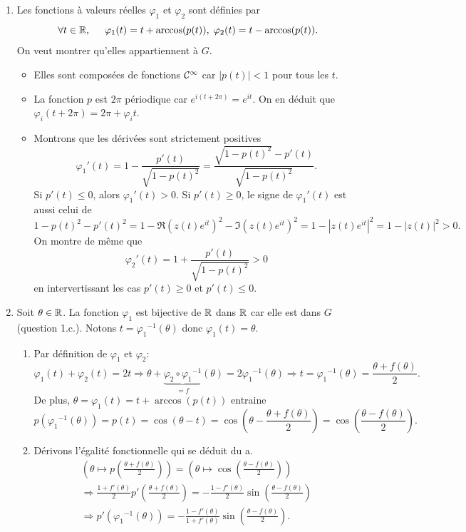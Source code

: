 \begin{enumerate}
\item Les fonctions à valeurs réelles $\varphi_1$ et $\varphi_2$ sont définies par
\[
  \forall t \in \mathbb{R},\hspace{0.5cm} \varphi_{1}(t) = t + \arccos(p(t)), \; \varphi_{2}(t) = t - \arccos(p(t)).
\]
On veut montrer qu'elles appartiennent à $G$.
\begin{itemize}
  \item Elles sont composées de fonctions $\mathcal{C} ^{\infty}$ car $|p(t)| < 1$ pour tous les $t$.
  \item La fonction $p$ est $2\pi$ périodique car $e^{i(t+2\pi)} = e^{it}$. On en déduit que $\varphi_i(t+2\pi) = 2\pi + \varphi_it$.
  \item Montrons que les dérivées sont strictement positives
\[
  \varphi_1'(t) = 1 - \frac{p'(t)}{\sqrt{1-p(t)^2}} = \frac{\sqrt{1-p(t)^2} - p'(t)}{\sqrt{1-p(t)^2}}.
\]
Si $p'(t) \leq 0$, alors $\varphi_1'(t)>0$. Si $p'(t) \geq 0$, le signe de $\varphi_1'(t)$ est aussi celui de 
\[
  1-p(t)^2 - p'(t)^2 = 1- \Re(z(t)e^{it})^2 - \Im(z(t)e^{it})^2 = 1 - |z(t)e^{it}|^2 = 1 - |z(t)|^2 > 0.
\]
On montre de même que 
\[
  \varphi_2'(t) = 1 + \frac{p'(t)}{\sqrt{1-p(t)^2}} > 0
\]
en intervertissant les cas $p'(t)\geq 0$ et $p'(t) \leq 0$.
\end{itemize}

\item Soit $\theta \in \mathbb{R}$. La fonction $\varphi_1$ est bijective de $\mathbb{R}$ dans $\mathbb{R}$ car elle est dans $G$ (question 1.c.). Notons $t = {\varphi_1}^{-1}(\theta)$ donc $\varphi_1(t) = \theta$.
\begin{enumerate}
  \item Par définition de $\varphi_1$ et $\varphi_2$:
\[
  \varphi_1(t) + \varphi_2(t) = 2t \Rightarrow \theta + \underset{= f}{\underbrace{\varphi_2 \circ {\varphi_1}^{-1}}}(\theta) = 2 {\varphi_1}^{-1}(\theta)
  \Rightarrow t = {\varphi_1}^{-1}(\theta) = \frac{\theta + f(\theta)}{2}.
\]
De plus, $\theta = \varphi_1(t) = t + \arccos(p(t))$ entraine
\[
  p({\varphi_1}^{-1}(\theta)) = p(t) = \cos(\theta - t) = \cos(\theta - \frac{\theta + f(\theta)}{2})
   = \cos(\frac{\theta - f(\theta)}{2}).
\]

  \item 
Dérivons l'égalité fonctionnelle qui se déduit du a.
\begin{multline*}
  \left( \theta \mapsto p(\frac{\theta + f(\theta)}{2}) \right) = \left( \theta \mapsto \cos(\frac{\theta - f(\theta)}{2}) \right) \\
  \Rightarrow 
  \frac{1+f'(\theta)}{2}p'(\frac{\theta + f(\theta)}{2}) = - \frac{1-f'(\theta)}{2} \sin(\frac{\theta - f(\theta)}{2}) \\
  \Rightarrow
  p'({\varphi_1}^{-1}(\theta)) = -\frac{1 - f'(\theta)}{1 + f'(\theta)}\sin(\frac{\theta - f(\theta)}{2}).
\end{multline*}


\end{enumerate}
\end{enumerate}
